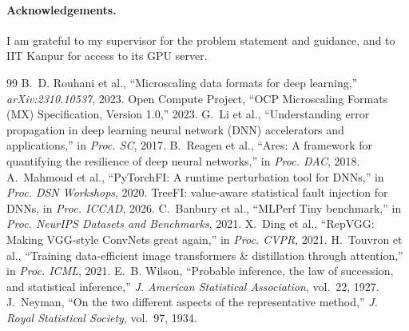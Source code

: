 \documentclass[10pt,a4paper]{article}
\begin{document}
\paragraph{Acknowledgements.} I am grateful to my supervisor for the problem statement and
guidance, and to IIT Kanpur for access to its GPU server.

\begin{thebibliography}{99}
\small
{}
B.~D. Rouhani et al., ``Microscaling data formats for deep learning,''
\emph{arXiv:2310.10537}, 2023.
Open Compute Project, ``OCP Microscaling Formats (MX) Specification, Version 1.0,'' 2023.
G.~Li et al., ``Understanding error propagation in deep learning neural network (DNN)
accelerators and applications,'' in \emph{Proc. SC}, 2017.
B.~Reagen et al., ``Ares: A framework for quantifying the resilience of deep neural
networks,'' in \emph{Proc. DAC}, 2018.
A.~Mahmoud et al., ``PyTorchFI: A runtime perturbation tool for DNNs,'' in \emph{Proc. DSN
Workshops}, 2020.
TreeFI: value-aware statistical fault injection for DNNs, in \emph{Proc. ICCAD}, 2026.
C.~Banbury et al., ``MLPerf Tiny benchmark,'' in \emph{Proc. NeurIPS Datasets and Benchmarks},
2021.
X.~Ding et al., ``RepVGG: Making VGG-style ConvNets great again,'' in \emph{Proc. CVPR}, 2021.
H.~Touvron et al., ``Training data-efficient image transformers \& distillation through
attention,'' in \emph{Proc. ICML}, 2021.
E.~B. Wilson, ``Probable inference, the law of succession, and statistical inference,''
\emph{J. American Statistical Association}, vol.~22, 1927.
J.~Neyman, ``On the two different aspects of the representative method,'' \emph{J. Royal
Statistical Society}, vol.~97, 1934.
\end{thebibliography}
\end{document}
